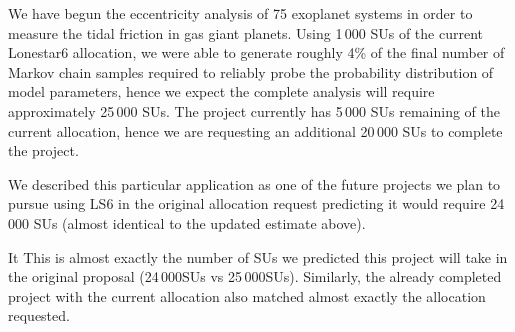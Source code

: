 \documentclass{article}
\begin{document}
We have begun the eccentricity analysis of 75 exoplanet systems in order to
measure the tidal friction in gas giant planets. Using 1\,000 SUs of the current
Lonestar6 allocation, we were able to generate roughly 4\% of the final number
of Markov chain samples required to reliably probe the probability distribution
of model parameters, hence we expect the complete analysis will require
approximately 25\,000 SUs. The project currently has 5\,000 SUs remaining of the
current allocation, hence we are requesting an additional 20\,000 SUs to
complete the project.

We described this particular application as one of the future projects we plan
to pursue using LS6 in the original allocation request predicting it would
require 24\,000 SUs (almost identical to the updated estimate above).

It This is almost exactly the number of SUs we predicted this project will take
in the original proposal (24\,000SUs vs 25\,000SUs). Similarly, the already
completed project with the current allocation also matched almost exactly the
allocation requested.
\end{document}
